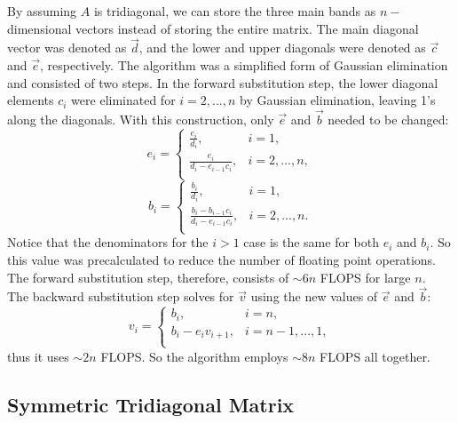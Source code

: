 \documentclass[prb,aps,twocolumn,showpacs,10pt]{revtex4-1}
\begin{document}
By assuming $A$ is tridiagonal, we can store the three main bands as $n-$dimensional vectors instead of storing the entire matrix. The main diagonal vector was denoted as $\vec{d}$, and the lower and upper diagonals were denoted as $\vec{c}$ and $\vec{e}$, respectively. The algorithm was a simplified form of Gaussian elimination and consisted of two steps. In the forward substitution step, the lower diagonal elements $c_i$ were eliminated for $i=2,...,n$ by Gaussian elimination, leaving 1's along the diagonals. With this construction, only $\vec{e}$ and $\vec{b}$ needed to be changed:
\begin{equation}
e_i = \begin{cases} 
      \frac{e_i}{d_i}, &i=1,\\
      \frac{e_i}{d_i-e_{i-1}c_i}, &i=2,...,n,\\
   \end{cases}
\end{equation}
\begin{equation}
b_i = \begin{cases} 
      \frac{b_i}{d_i}, &i=1,\\
      \frac{b_i-b_{i-1}c_i}{d_i-e_{i-1}c_i}, &i=2,...,n.\\
   \end{cases}
\end{equation}
Notice that the denominators for the $i>1$ case is the same for both $e_i$ and $b_i$. So this value was precalculated to reduce the number of floating point operations. The forward substitution step, therefore, consists of $\sim 6n$ FLOPS for large $n$.\\

The backward substitution step solves for $\vec{v}$ using the new values of $\vec{e}$ and $\vec{b}$:
\begin{equation}
v_i = \begin{cases} 
      b_i, &i=n,\\
      b_i-e_i v_{i+1}, &i=n-1,...,1,\\
   \end{cases}
\end{equation}
thus it uses $\sim 2n$ FLOPS. So the algorithm employs $\sim 8n$ FLOPS all together. 

\subsection{Symmetric Tridiagonal Matrix}
\end{document}
